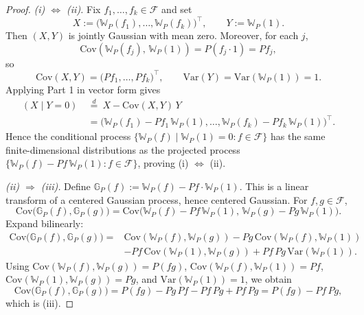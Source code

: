 \documentclass[12pt]{article}
\renewcommand{\(}{\left(}%
\renewcommand{\)}{\right)}%
\renewcommand{\[}{\left[}%
\renewcommand{\]}{\right]}%
\newtheorem{proof}{Proof.}}
\begin{document}
\begin{proof}
\emph{(i) $\Leftrightarrow$ (ii).}
Fix $f_1,\dots,f_k\in\mathcal F$ and set
\begin{equation*}
X:=\big(\mathbb W_P(f_1),\dots,\mathbb W_P(f_k)\big)^\top,\qquad Y:=\mathbb W_P(1).
\end{equation*}
Then $(X,Y)$ is jointly Gaussian with mean zero. Moreover, for each $j$,
\begin{equation*}
\mathrm{Cov}( \mathbb W_P(f_j),\,\mathbb W_P(1)) = P(f_j\cdot 1)=Pf_j,
\end{equation*}
so
\begin{equation*}
\mathrm{Cov}(X,Y)=\big(Pf_1,\dots,Pf_k\big)^\top,
\qquad
\mathrm{Var}(Y)=\mathrm{Var}(\mathbb W_P(1))=1.
\end{equation*}
Applying Part 1 in vector form gives
\begin{equation*}
\begin{split}
	(X\mid Y=0)\ &\stackrel{d}{=}\ X-\mathrm{Cov}(X,Y)\,Y\\
&=\big(\mathbb W_P(f_1)-Pf_1\,\mathbb W_P(1),\dots,\mathbb W_P(f_k)-Pf_k\,\mathbb W_P(1)\big)^\top.
\end{split}
\end{equation*}
Hence the conditional process $\{\mathbb W_P(f)\mid \mathbb W_P(1)=0:f\in\mathcal F\}$ has the same finite-dimensional distributions as the projected process $\{\mathbb W_P(f)-Pf\,\mathbb W_P(1):f\in\mathcal F\}$, proving (i) $\Leftrightarrow$ (ii).

\emph{(ii) $\Rightarrow$ (iii).}
Define $\mathbb G_P(f):=\mathbb W_P(f)-Pf\cdot\mathbb W_P(1)$. This is a linear transform of a centered Gaussian process, hence centered Gaussian. For $f,g\in\mathcal F$,
\begin{equation*}
\mathrm{Cov}\big(\mathbb G_P(f),\mathbb G_P(g)\big)
=\mathrm{Cov}\big(\mathbb W_P(f)-Pf\,\mathbb W_P(1),\,\mathbb W_P(g)-Pg\,\mathbb W_P(1)\big).
\end{equation*}
Expand bilinearly:
\begin{equation*}
\begin{split}
	\mathrm{Cov}\big(\mathbb G_P(f),\mathbb G_P(g)\big)
=&\mathrm{Cov}(\mathbb W_P(f),\mathbb W_P(g))
-Pg\,\mathrm{Cov}(\mathbb W_P(f),\mathbb W_P(1))\\
&-Pf\,\mathrm{Cov}(\mathbb W_P(1),\mathbb W_P(g))
+Pf\,Pg\,\mathrm{Var}(\mathbb W_P(1)).
\end{split}
\end{equation*}
Using $\mathrm{Cov}(\mathbb W_P(f),\mathbb W_P(g))=P(fg)$, $\mathrm{Cov}(\mathbb W_P(f),\mathbb W_P(1))=Pf$, $\mathrm{Cov}(\mathbb W_P(1),\mathbb W_P(g))=Pg$, and $\mathrm{Var}(\mathbb W_P(1))=1$, we obtain
\begin{equation*}
\mathrm{Cov}\big(\mathbb G_P(f),\mathbb G_P(g)\big)=P(fg)-Pg\,Pf-Pf\,Pg+Pf\,Pg=P(fg)-Pf\,Pg,
\end{equation*}
which is (iii).


\end{proof}
\end{document}
